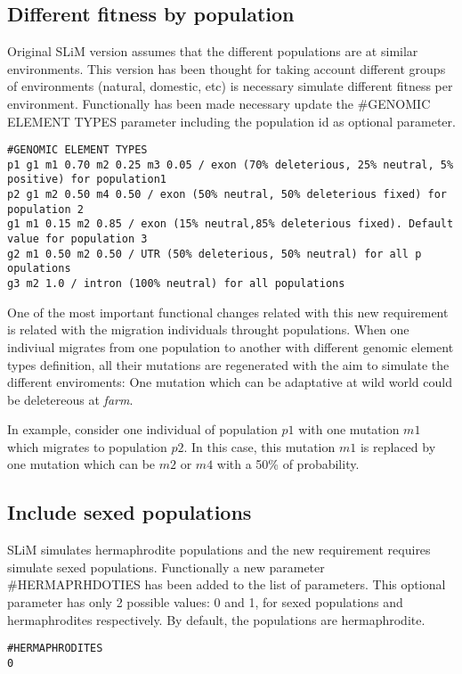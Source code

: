 \documentclass{article}
\begin{document}
\subsection{Different fitness by population}

Original SLiM version assumes that the different populations are at similar environments. This version has been thought for taking account different groups of environments (natural, domestic, etc) is necessary simulate different fitness per environment. Functionally has been made necessary update the \#GENOMIC ELEMENT TYPES parameter including the population id as optional parameter.

\begin{verbatim}
#GENOMIC ELEMENT TYPES
p1 g1 m1 0.70 m2 0.25 m3 0.05 / exon (70% deleterious, 25% neutral, 5% positive) for population1
p2 g1 m2 0.50 m4 0.50 / exon (50% neutral, 50% deleterious fixed) for population 2
g1 m1 0.15 m2 0.85 / exon (15% neutral,85% deleterious fixed). Default value for population 3
g2 m1 0.50 m2 0.50 / UTR (50% deleterious, 50% neutral) for all p opulations
g3 m2 1.0 / intron (100% neutral) for all populations
\end{verbatim}

One of the most important functional changes related with this new requirement is related with the migration individuals throught populations. When one indiviual migrates from one population to another with different genomic element types definition, all their mutations are regenerated with the aim to simulate the different enviroments: One mutation which can be adaptative at wild world could be deletereous at \textit{farm}. 

In example, consider one individual of population $p1$ with one mutation $m1$ which migrates to population $p2$. In this case, this mutation $m1$ is replaced by one mutation which can be $m2$ or $m4$ with a 50\% of probability.


\subsection{Include sexed populations}

SLiM simulates hermaphrodite populations and the new requirement requires simulate sexed populations. Functionally a new parameter \#HERMAPRHDOTIES has been added to the list of parameters. This optional parameter has only 2 possible values: 0 and 1, for sexed populations and hermaphrodites respectively. By default, the populations are hermaphrodite.
\begin{verbatim}
#HERMAPHRODITES 
0
\end{verbatim}
\end{document}
